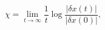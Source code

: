 \begin{equation}
  \chi=\lim_{t\to\infty} \frac{1}{t} \log \frac{|\delta x(t)|}{|\delta x(0)|},
\end{equation} 
